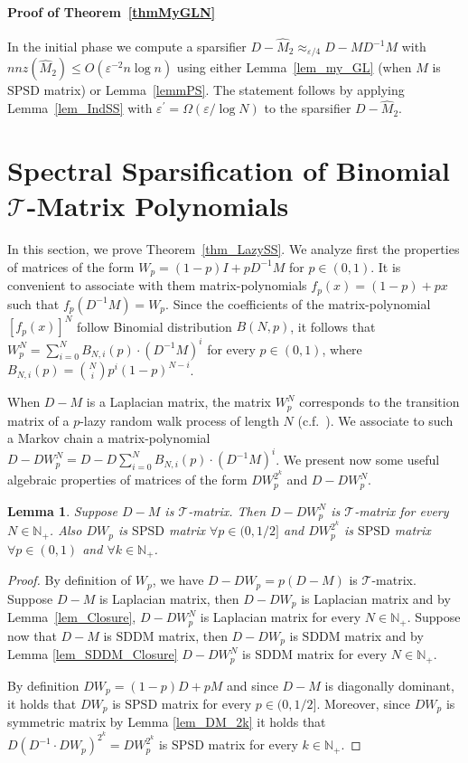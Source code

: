 \documentclass[11pt]{article}
\newcommand{\SDDM}{\mathrm{SDDM}}
\newcommand{\SPSD}{\mathrm{SPSD}}
\newcommand{\GL}{\mathcal{T}}
\newcommand{\hM}{\widehat{M}}
\newcommand{\Di}{D^{-1}}
\newcommand{\prm}{\prime}
\newcommand{\N}{\mathbb{N}}
\newcommand{\eps}{\epsilon}
\renewcommand{\leq}{\leqslant}
\renewcommand{\eps}{\varepsilon}
\newcommand{\mylemma}[2]{\begin{lem}\label{lem:#1}#2\end{lem}}
\newtheorem{lem}[thm]{Lemma}
\numberwithin{thm}{section}
\begin{document}
\paragraph*{Proof of Theorem~\ref{thmMyGLN}}
In the initial phase we compute a sparsifier $D-\hM_{2}\approx_{\eps/4}D-M\Di M$ with $nnz(\hM_{2})\leq O(\eps^{-2}n\log n)$ using either Lemma~\ref{lem_my_GL} (when $M$ is $\SPSD$ matrix) or Lemma~\ref{lemmPS}. The statement follows by applying Lemma~\ref{lem_IndSS} with $\eps^{\prm}=\Omega(\eps/\log N)$ to the sparsifier $D-\hM_{2}$.



\section{Spectral Sparsification of Binomial $\GL$-Matrix Polynomials}\label{sec:SSBGLPM}

In this section, we prove Theorem~\ref{thm_LazySS}. We analyze first the properties of matrices of the form $W_{p}=(1-p)I+p\Di M$ for $p\in(0,1)$. It is convenient to associate with them matrix-polynomials $f_{p}(x)=(1-p)+px$ such that $f_{p}(\Di M)=W_{p}$. Since the coefficients of the matrix-polynomial $[f_{p}(x)]^{N}$ follow Binomial distribution $B(N,p)$, it follows that
$W_{p}^{N} = \sum_{i=0}^{N}B_{N,i}(p)\cdot(\Di M)^{i}$ for every $p\in(0,1)$, where $B_{N,i}(p)={N \choose i}p^{i}(1-p)^{N-i}$.

When $D-M$ is a Laplacian matrix, the matrix $W_{p}^N$ corresponds to the transition matrix of a $p$-lazy random walk process of length $N$ (c.f.~\cite{SJ89}). We associate to such a Markov chain a matrix-polynomial $D-DW_{p}^{N}=D - D\sum_{i=0}^{N} B_{N,i}(p) \cdot(\Di M)^{i}$. We present now some useful algebraic properties of matrices of the form $DW_{p}^{2^{k}}$ and $D-DW_{p}^{N}$.

\newcommand{\lemDDWWp}
{
Suppose $D-M$ is $\GL$-matrix. Then
$D-DW_{p}^{N}$ is $\GL$-matrix for every $N\in\N_{+}$. Also $DW_{p}$
is $\SPSD$ matrix $\forall p\in(0,1/2]$ and $DW_{p}^{2^{k}}$
is $\SPSD$ matrix $\forall p\in(0,1)$ and $\forall k\in\N_{+}$.
}
\mylemma{lemDDWWp}{\lemDDWWp}

\begin{proof}
By definition of $W_{p}$, we have $D-DW_{p}=p(D-M)$ is $\GL$-matrix. Suppose $D-M$ is Laplacian matrix, then $D-DW_{p}$ is Laplacian matrix and by Lemma~\ref{lem_Closure}, $D-DW_{p}^{N}$ is Laplacian matrix for every $N\in\N_{+}$. Suppose now that $D-M$ is $\SDDM$ matrix, then $D-DW_{p}$ is $\SDDM$ matrix and by Lemma \ref{lem_SDDM_Closure} $D-DW_{p}^{N}$ is $\SDDM$ matrix for every $N\in\N_{+}$.

By definition $DW_{p}=(1-p)D+pM$
and since $D-M$ is diagonally dominant, it holds that
$DW_{p}$ is $\SPSD$ matrix for every $p\in(0,1/2]$.
Moreover, since $DW_{p}$ is symmetric matrix by Lemma \ref{lem_DM_2k} it holds that $D(\Di\cdot DW_{p})^{2^{k}}=DW_{p}^{2^{k}}$ is $\SPSD$ matrix for every $k\in\N_{+}$.
\end{proof}
\end{document}
